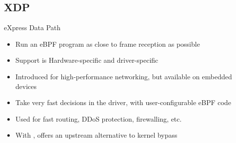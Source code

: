 \subsection{XDP}

\begin{frame}{eXpress Data Path}
	\begin{itemize}
		\item Run an eBPF program as close to frame reception as possible
		\item Support is Hardware-specific and driver-specific
		\item Introduced for high-performance networking, but available on embedded devices
		\item Take very fast decisions in the driver, with user-configurable eBPF code
		\item Used for fast routing, DDoS protection, firewalling, etc.
		\item With , offers an upstream alternative to kernel bypass
	\end{itemize}
\end{frame}

